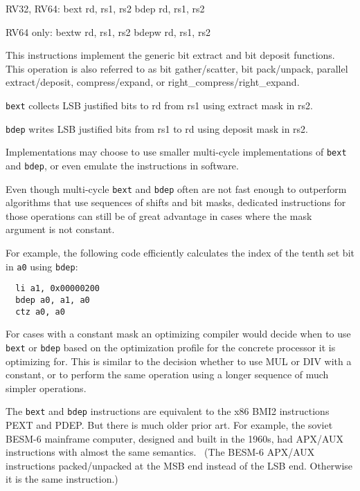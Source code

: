 \begin{rvb}
  RV32, RV64:
    bext rd, rs1, rs2
    bdep rd, rs1, rs2

  RV64 only:
    bextw rd, rs1, rs2
    bdepw rd, rs1, rs2
\end{rvb}

This instructions implement the generic bit extract and bit deposit functions.
This operation is also referred to as bit gather/scatter, bit pack/unpack,
parallel extract/deposit, compress/expand, or right\_compress/right\_expand.

\texttt{bext} collects LSB justified bits to rd from rs1 using extract mask in rs2.

\texttt{bdep} writes LSB justified bits from rs1 to rd using deposit mask in rs2.



Implementations may choose to use smaller multi-cycle implementations of
\texttt{bext} and \texttt{bdep}, or even emulate the instructions in software.

Even though multi-cycle \texttt{bext} and \texttt{bdep} often are not fast
enough to outperform algorithms that use sequences of shifts and bit masks,
dedicated instructions for those operations can still be of great advantage in
cases where the mask argument is not constant.

For example, the following code efficiently calculates the index of the tenth
set bit in {\tt a0} using \texttt{bdep}:

\begin{minipage}{\linewidth}
\begin{verbatim}
  li a1, 0x00000200
  bdep a0, a1, a0
  ctz a0, a0
\end{verbatim}
\end{minipage}

For cases with a constant mask an optimizing compiler would decide when to use
\texttt{bext} or \texttt{bdep} based on the optimization profile for the
concrete processor it is optimizing for. This is similar to the decision
whether to use MUL or DIV with a constant, or to perform the same operation
using a longer sequence of much simpler operations.

The \texttt{bext} and \texttt{bdep} instructions are equivalent to the x86 BMI2
instructions PEXT and PDEP. But there is much older prior art. For example, the
soviet BESM-6 mainframe computer, designed and built in the 1960s, had APX/AUX
instructions with almost the same semantics.~\cite{BESM6} (The BESM-6 APX/AUX
instructions packed/unpacked at the MSB end instead of the LSB end. Otherwise
it is the same instruction.)

